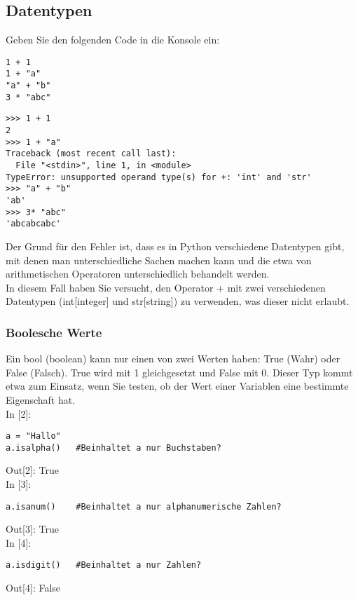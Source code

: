 \documentclass{article}
\begin{document}
\subsection{Datentypen}
Geben Sie den folgenden Code in die Konsole ein:\\
\begin{verbatim}
1 + 1
1 + "a"
"a" + "b"
3 * "abc"
\end{verbatim}
\newpage
\begin{verbatim}
>>> 1 + 1
2
>>> 1 + "a"
Traceback (most recent call last):
  File "<stdin>", line 1, in <module>
TypeError: unsupported operand type(s) for +: 'int' and 'str'
>>> "a" + "b"
'ab'
>>> 3* "abc"
'abcabcabc'
\end{verbatim}
Der Grund für den Fehler ist, dass es in Python verschiedene Datentypen gibt, mit denen man unterschiedliche Sachen machen kann und die etwa von arithmetischen Operatoren unterschiedlich behandelt werden.\\
In diesem Fall haben Sie versucht, den Operator + mit zwei verschiedenen Datentypen (int[integer] und str[string]) zu verwenden, was dieser nicht erlaubt.\\
\subsubsection{Boolesche Werte}
Ein bool (boolean) kann nur einen von zwei Werten haben: True (Wahr) oder False (Falsch). True wird mit 1 gleichgesetzt und False mit 0. Dieser Typ kommt etwa zum Einsatz, wenn Sie testen, ob der Wert einer Variablen eine bestimmte Eigenschaft hat.\\
In [2]:
\begin{verbatim}
a = "Hallo"
a.isalpha()   #Beinhaltet a nur Buchstaben?
\end{verbatim}
Out[2]: True\\
In [3]:
\begin{verbatim}
a.isanum()    #Beinhaltet a nur alphanumerische Zahlen? 
\end{verbatim}
Out[3]: True\\
In [4]:
\begin{verbatim}
a.isdigit()   #Beinhaltet a nur Zahlen?
\end{verbatim}
Out[4]: False\\
\end{document}
